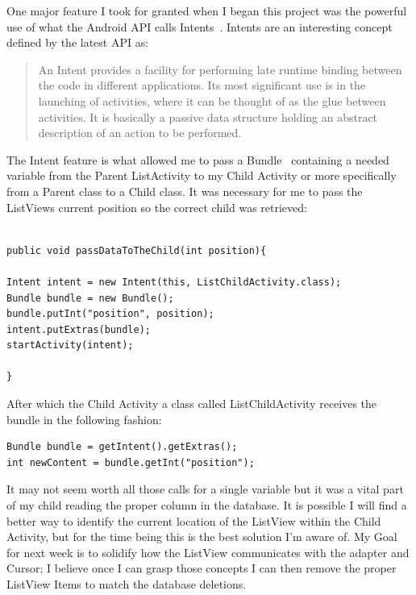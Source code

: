\documentclass[fontsize=11pt, %
paper=a4, %
twoside, %
captions=tableheading,
index=totoc,
hyperref]{labbook}
\begin{document}
\clearpage
{}
\begin{onehalfspace}
One major feature I took for granted when I began this project was the powerful use of what the Android API calls Intents~\citep{Intent}. Intents are an interesting concept defined by the latest API as:
\end{onehalfspace}
\begin{quote}
An Intent provides a facility for performing late runtime binding between the code in different applications. Its most significant use is in the launching of activities, where it can be thought of as the glue between activities. It is basically a passive data structure holding an abstract description of an action to be performed.
\end{quote}
\begin{onehalfspace}
	The Intent feature is what allowed me to pass a Bundle~\citep{Bundle} containing a needed variable from the Parent ListActivity to my Child Activity or more specifically from a Parent class to a Child class. It was necessary for me to pass the ListViews current position so the correct child was retrieved:
\end{onehalfspace}
\begin{verbatim}

public void passDataToTheChild(int position){

Intent intent = new Intent(this, ListChildActivity.class);
Bundle bundle = new Bundle();
bundle.putInt("position", position);
intent.putExtras(bundle);
startActivity(intent);

}
\end{verbatim}
\begin{onehalfspace}
After which the Child Activity a class called ListChildActivity receives the bundle in the following fashion:
\end{onehalfspace}
\begin{verbatim}
Bundle bundle = getIntent().getExtras();
int newContent = bundle.getInt("position");
\end{verbatim}

\begin{onehalfspace}
It may not seem worth all those calls for a single variable but it was a vital part of my child reading the proper column in the database. It is possible I will find a better way to identify the current location of the ListView within the Child Activity, but for the time being this is the best solution I'm aware of. My Goal for next week is to solidify how the ListView communicates with the adapter and Cursor; I believe once I can grasp those concepts I can then remove the proper ListView Items to match the database deletions. 
\end{onehalfspace}

\clearpage
\printbibliography
\end{document}
